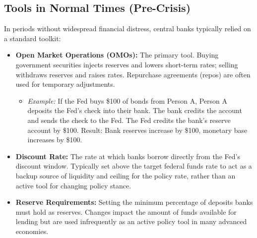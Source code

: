 \subsection{Tools in Normal Times (Pre-Crisis)}
In periods without widespread financial distress, central banks typically relied on a standard toolkit:
\begin{itemize}
    \item \textbf{Open Market Operations (OMOs):} The primary tool. Buying government securities injects reserves and lowers short-term rates; selling withdraws reserves and raises rates. Repurchase agreements (repos) are often used for temporary adjustments.
        \begin{itemize}
            \item \textit{Example:} If the Fed buys \$100 of bonds from Person A, Person A deposits the Fed's check into their bank. The bank credits the account and sends the check to the Fed. The Fed credits the bank's reserve account by \$100. Result: Bank reserves increase by \$100, monetary base increases by \$100.
        \end{itemize}
    \item \textbf{Discount Rate:} The rate at which banks borrow directly from the Fed's discount window. Typically set above the target federal funds rate to act as a backup source of liquidity and ceiling for the policy rate, rather than an active tool for changing policy stance.
    \item \textbf{Reserve Requirements:} Setting the minimum percentage of deposits banks must hold as reserves. Changes impact the amount of funds available for lending but are used infrequently as an active policy tool in many advanced economies.
\end{itemize}

